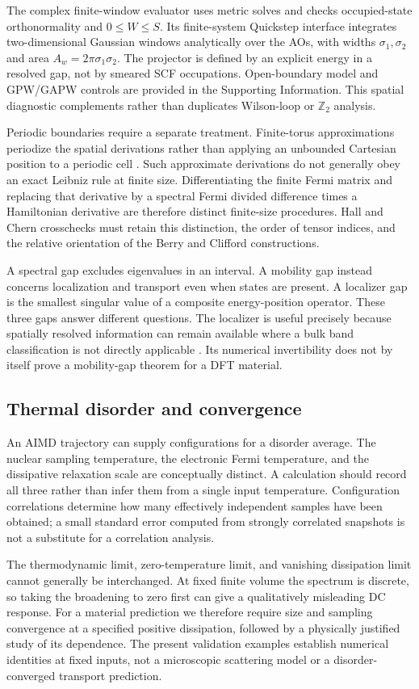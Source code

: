 The complex finite-window evaluator uses metric solves and checks
occupied-state orthonormality and $0\leq W\leq S$. Its finite-system
Quickstep interface integrates two-dimensional Gaussian windows
analytically over the AOs, with widths $\sigma_1,\sigma_2$ and area
$A_w=2\pi\sigma_1\sigma_2$. The projector is defined by an explicit
energy in a resolved gap, not by smeared SCF occupations.
Open-boundary model and GPW/GAPW controls are provided in the
Supporting Information. This spatial diagnostic complements rather
than duplicates Wilson-loop or $\mathbb Z_2$ analysis.

Periodic boundaries require a separate treatment. Finite-torus
approximations periodize the spatial derivations rather than applying
an unbounded Cartesian position to a periodic cell
\cite{Prodan2013,BauMarrazzo2024}. Such approximate derivations do not
generally obey an exact Leibniz rule at finite size. Differentiating
the finite Fermi matrix and replacing that derivative by a spectral
Fermi divided difference times a Hamiltonian derivative are therefore
distinct finite-size procedures. Hall and Chern crosschecks must
retain this distinction, the order of tensor indices, and the relative
orientation of the Berry and Clifford constructions.

A spectral gap excludes eigenvalues in an interval. A mobility gap
instead concerns localization and transport even when states are
present. A localizer gap is the smallest singular value of a composite
energy-position operator. These three gaps answer different questions.
The localizer is useful precisely because spatially resolved
information can remain available where a bulk band classification is
not directly applicable \cite{Dixon2023}. Its numerical invertibility
does not by itself prove a mobility-gap theorem for a DFT material.

\subsection{Thermal disorder and convergence}
An AIMD trajectory can supply configurations for a disorder average.
The nuclear sampling temperature, the electronic Fermi temperature,
and the dissipative relaxation scale are conceptually distinct.
A calculation should record all three rather than infer them from a
single input temperature. Configuration correlations determine how
many effectively independent samples have been obtained; a small
standard error computed from strongly correlated snapshots is not a
substitute for a correlation analysis.

The thermodynamic limit, zero-temperature limit, and vanishing
dissipation limit cannot generally be interchanged. At fixed finite
volume the spectrum is discrete, so taking the broadening to zero
first can give a qualitatively misleading DC response. For a material
prediction we therefore require size and sampling convergence at a
specified positive dissipation, followed by a physically justified
study of its dependence. The present validation examples establish
numerical identities at fixed inputs, not a microscopic scattering
model or a disorder-converged transport prediction.
